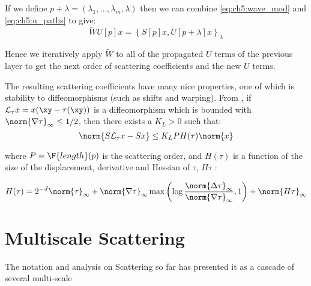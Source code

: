If we define $p + \lambda = (\lambda_1, \ldots, \lambda_m, \lambda)$ then we can
combine \autoref{eq:ch5:wave_mod} and \autoref{eq:ch5:u_paths} to give:
%
\begin{equation}
  \tilde{W} U[p] x = \left\{S[p]x, U[p+\lambda]x \right\}_{\lambda}
\end{equation}

Hence we iteratively apply $\tilde{W}$ to all of the propagated $U$ terms of
the previous layer to get the next order of scattering coefficients and
the new $U$ terms.

The resulting scattering coefficients have many nice properties, one of which is
stability to diffeomorphisms (such as shifts and warping). From
\cite{mallat_group_2012}, if $\mathcal{L}_\tau
x = x(\xy -\tau(\xy))$ is a diffeomorphism which is bounded with 
$\norm{\nabla \tau}_{\infty} \leq 1/2$, then there exists a $K_L > 0$ such
that:
%
\begin{equation}
  \norm{ S \mathcal{L}_{\tau}x  - S x} \leq K_L P H(\tau) \norm{x}
  \label{eq:stability}
\end{equation}

where $P = \F{length}(p)$ is the scattering order, and $H(\tau)$ is a function
of the size of the displacement, derivative and Hessian of $\tau$, $H\tau$
\cite{mallat_group_2012}: 

\begin{equation}
  H(\tau) = 2^{-J} \norm{\tau}_{\infty} + \norm{\nabla \tau}_{\infty} \max\left(\log
  \frac{\norm{\Delta \tau}_{\infty} }{\norm{\nabla \tau}_{\infty}}, 1 \right) +
  \norm{H\tau}_{\infty}
\end{equation}

\section{Multiscale Scattering}
The notation and analysis on Scattering so far has presented it as a cascade of
several multi-scale 

